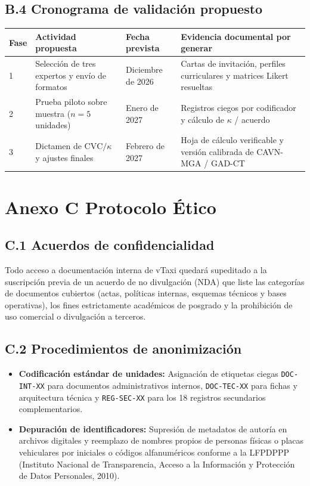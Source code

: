 {\subsection*{B.4 Cronograma de validación propuesto}
\begin{center}
\begingroup\footnotesize
\renewcommand{\arraystretch}{1.2}
\setlength{\tabcolsep}{4pt}
\begin{tabular}{@{}p{0.8cm}p{4.6cm}p{2.5cm}p{5.5cm}@{}}
\toprule
\textbf{Fase} & \textbf{Actividad propuesta} & \textbf{Fecha prevista} & \textbf{Evidencia documental por generar} \\
\midrule
1 & Selección de tres expertos y envío de formatos & Diciembre de 2026 & Cartas de invitación, perfiles curriculares y matrices Likert resueltas \\
2 & Prueba piloto sobre muestra ($n = 5$ unidades) & Enero de 2027 & Registros ciegos por codificador y cálculo de $\kappa$ / acuerdo \\
3 & Dictamen de $\text{CVC}/\kappa$ y ajustes finales & Febrero de 2027 & Hoja de cálculo verificable y versión calibrada de CAVN-MGA / GAD-CT \\
\bottomrule
\end{tabular}
\endgroup
\end{center}

\clearpage
\section*{Anexo C Protocolo Ético}
\subsection*{C.1 Acuerdos de confidencialidad}
Todo acceso a documentación interna de vTaxi quedará supeditado a la suscripción previa de un acuerdo de no divulgación (NDA) que liste las categorías de documentos cubiertos (actas, políticas internas, esquemas técnicos y bases operativas), los fines estrictamente académicos de posgrado y la prohibición de uso comercial o divulgación a terceros.

\subsection*{C.2 Procedimientos de anonimización}
\begin{itemize}
    \item \textbf{Codificación estándar de unidades:} Asignación de etiquetas ciegas \texttt{DOC-INT-XX} para documentos administrativos internos, \texttt{DOC-TEC-XX} para fichas y arquitectura técnica y \texttt{REG-SEC-XX} para los 18 registros secundarios complementarios.
    \item \textbf{Depuración de identificadores:} Supresión de metadatos de autoría en archivos digitales y reemplazo de nombres propios de personas físicas o placas vehiculares por iniciales o códigos alfanuméricos conforme a la LFPDPPP (Instituto Nacional de Transparencia, Acceso a la Información y Protección de Datos Personales, 2010).
\end{itemize}

}
